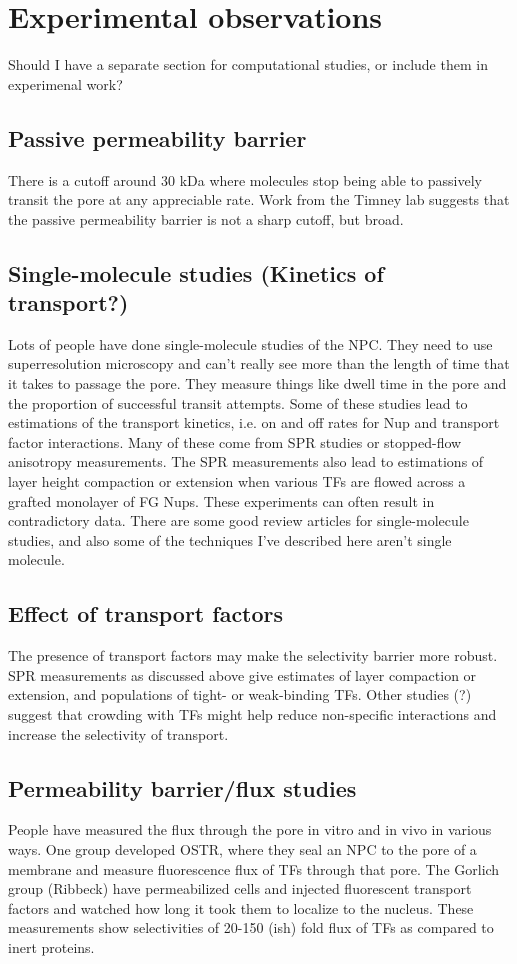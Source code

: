 \section{Experimental observations} Should I have a separate section for computational studies, or include them in experimenal work?
\subsection{Passive permeability barrier}
There is a cutoff around 30 kDa where molecules stop being able to passively transit the pore at any appreciable rate.  Work from the Timney lab suggests that the passive permeability barrier is not a sharp cutoff, but broad.
\subsection{Single-molecule studies (Kinetics of transport?)}
Lots of people have done single-molecule studies of the NPC.  They need to use superresolution microscopy and can't really see more than the length of time that it takes to passage the pore.  They measure things like dwell time in the pore and the proportion of successful transit attempts.  Some of these studies lead to estimations of the transport kinetics, i.e. on and off rates for Nup and transport factor interactions.  Many of these come from SPR studies or stopped-flow anisotropy measurements.  The SPR measurements also lead to estimations of layer height compaction or extension when various TFs are flowed across a grafted monolayer of FG Nups.  These experiments can often result in contradictory data.  There are some good review articles for single-molecule studies, and also some of the techniques I've described here aren't single molecule.
\subsection{Effect of transport factors}
The presence of transport factors may make the selectivity barrier more robust.  SPR measurements as discussed above give estimates of layer compaction or extension, and populations of tight- or weak-binding TFs.  Other studies (?) suggest that crowding with TFs might help reduce non-specific interactions and increase the selectivity of transport.
\subsection{Permeability barrier/flux studies}
People have measured the flux through the pore in vitro and in vivo in various ways.  One group developed OSTR, where they seal an NPC to the pore of a membrane and measure fluorescence flux of TFs through that pore.  The Gorlich group (Ribbeck) have permeabilized cells and injected fluorescent transport factors and watched how long it took them to localize to the nucleus.  These measurements show selectivities of 20-150 (ish) fold flux of TFs as compared to inert proteins.
